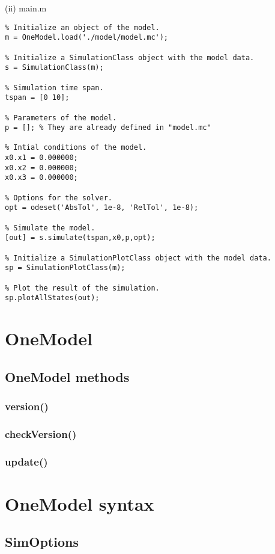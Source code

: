 \documentclass[11pt]{article}
\begin{document}
(ii) main.m

\begin{lstlisting}
% Initialize an object of the model.
m = OneModel.load('./model/model.mc');

% Initialize a SimulationClass object with the model data.
s = SimulationClass(m);

% Simulation time span.
tspan = [0 10];

% Parameters of the model.
p = []; % They are already defined in "model.mc"

% Intial conditions of the model.
x0.x1 = 0.000000;
x0.x2 = 0.000000;
x0.x3 = 0.000000;

% Options for the solver.
opt = odeset('AbsTol', 1e-8, 'RelTol', 1e-8);

% Simulate the model.
[out] = s.simulate(tspan,x0,p,opt);

% Initialize a SimulationPlotClass object with the model data.
sp = SimulationPlotClass(m);

% Plot the result of the simulation.
sp.plotAllStates(out);
\end{lstlisting}

\section{OneModel}

\subsection{OneModel methods}

\subsubsection{version()}

\subsubsection{checkVersion()}

\subsubsection{update()}

\section{OneModel syntax}

\subsection{SimOptions}
\end{document}
